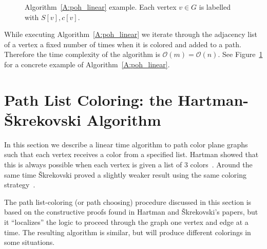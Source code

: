 \documentclass[12pt,letterpaper]{article}
\theoremstyle{plain}
\theoremstyle{definition}
\theoremstyle{break}
\begin{document}
\begin{figure}[ht]
\begin{center}
\caption{Algorithm~\ref{A:poh_linear} example. Each vertex $v\in G$ is labelled with $S[v],c[v]$.}
\label{F:poh_example}
\end{center}
\end{figure}

While executing Algorithm~\ref{A:poh_linear} we iterate through
the adjacency list of a vertex a fixed number of times when it is colored and added
to a path. Therefore the time complexity of the algorithm is
$\mathcal{O}(m)=\mathcal{O}(n)$. See Figure~\ref{F:poh_example} for a concrete example of
Algorithm~\ref{A:poh_linear}.

\section{Path List Coloring: the Hartman-\v{S}krekovski Algorithm}

In this section we describe a linear time algorithm to path color
plane graphs such that each vertex receives a color from a specified list.
Hartman showed that this is always possible when each vertex is given a
list of $3$ colors~\cite[Thm.~4.1]{Har1997}. Around the same
time \v{S}krekovski proved a
slightly weaker result using the same coloring
strategy~\cite[Thm.~2.2b]{Skr1999}.

The path list-coloring (or path choosing) procedure discussed in this section is
based on the constructive proofs found in Hartman and
\v{S}krekovski's papers, but it ``localizes'' the logic to proceed through the
graph one vertex and edge at a time. The resulting algorithm is
similar, but will produce different colorings in some situations.
\end{document}
